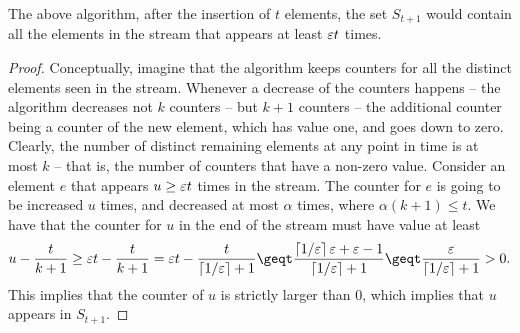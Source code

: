 \begin{lemma}
    The above algorithm, after the insertion of $t$ elements, the set
    $S_{t+1}$ would contain all the elements in the stream that
    appears at least ${\varepsilon} t$ times. 
\end{lemma}
\begin{proof}
    Conceptually, imagine that the algorithm keeps counters for all
    the distinct elements seen in the stream. Whenever a decrease of
    the counters happens -- the algorithm decreases not $k$ counters --
    but $k+1$ counters -- the additional counter being a counter of
    the new element, which has value one, and goes down to zero.
    Clearly, the number of distinct remaining elements at any point in
    time is at most $k$ -- that is, the number of counters that have a
    non-zero value.  Consider an element $e$ that appears
    $u \geq {\varepsilon} t$ times in the stream. The counter for $e$ is going
    to be increased $u$ times, and decreased at most $\alpha$ times,
    where
    \begin{math}
        \alpha (k+1) \leq t.
    \end{math}
    We have that the counter for $u$ in the end of the stream must
    have value at least
    \begin{equation*}
        u - \frac{t}{k+1}%
        \geq%
        \eps t - \frac{t}{k+1}
        = 
        \eps t - \frac{t}{\ceil{1/\eps}+1}
        \geq%
        t \frac{\ceil{1/\eps}\eps +\eps - 1}{\ceil{1/\eps}+1}
        \geq%
        t \frac{\eps}{\ceil{1/\eps}+1} > 0.
    \end{equation*}
    This implies that the counter of $u$ is strictly larger than $0$,
    which implies that $u$ appears in $S_{t+1}$.
\end{proof}

















\nocite{mr-ra-95}

\ChapterEnd{}


